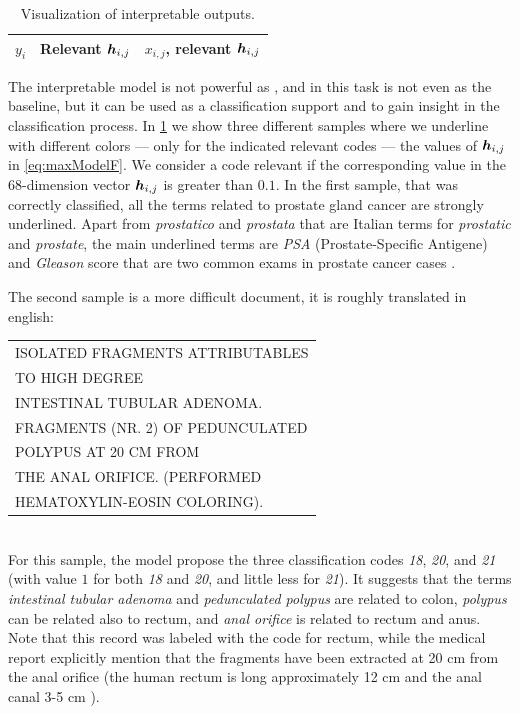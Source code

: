 \begin{table}
  \centering
  \ttfamily
  \scriptsize
  \caption{Visualization of interpretable outputs.}
  \label{tab:multiAttention1}
  \begin{tabular}{|c|c|c|}
    \hline
    $y_i$&\textrm{Relevant} $\bm{h}_{i,j}$&$x_{i,j}$\textrm{, relevant} $\bm{h}_{i,j}$\\
    \hline
    
    \hline
    
    \hline
    
    \hline
  \end{tabular}
\end{table}
The interpretable model is not powerful as \maxp{}, and in this task
is not even as the baseline, but it can be used as a
classification support and to 
gain insight in the classification process. In
\cref{tab:multiAttention1} we show three different samples where we
underline with different colors --- only for the indicated relevant
codes --- the values of $\bm{h}_{i,j}$ in \eqref{eq:maxModelF}. We
consider a code relevant if the corresponding value in the
68-dimension vector $\bm{h}_{i,j}$ is greater than $0.1$. In the
first sample, that was correctly classified, all the terms related to
prostate gland cancer are strongly underlined. Apart from
\emph{prostatico} and \emph{prostata} that are Italian terms for
\emph{prostatic} and \emph{prostate}, the main underlined terms are
\emph{PSA} (Prostate-Specific Antigene) and \emph{Gleason} score that
are two common exams in prostate cancer cases
\cite{brimo2013prostate}.

The second sample is a more difficult
document, it is roughly translated in english:\\
\begin{small}
  \ttfamily
  \begin{tabular}{l}
    ISOLATED FRAGMENTS ATTRIBUTABLES\\
    TO HIGH DEGREE\\
    INTESTINAL TUBULAR ADENOMA.\\
    FRAGMENTS (NR. 2) OF PEDUNCULATED\\
    POLYPUS AT 20 CM FROM\\
    THE ANAL ORIFICE. (PERFORMED\\
    HEMATOXYLIN-EOSIN COLORING).
\end{tabular}
\end{small}\\
For this sample, the model propose the three classification codes \emph{18},
\emph{20}, and \emph{21} (with value $1$ for both \emph{18} and
\emph{20}, and little less for \emph{21}). It suggests that the terms
\emph{intestinal tubular adenoma} and \emph{pedunculated polypus} are
related to colon, \emph{polypus} can be related also to rectum, and
\emph{anal orifice} is related to rectum and anus. Note that this
record was labeled with the code for rectum, while the medical report
explicitly mention that the fragments have been extracted at 20 cm
from the anal orifice (the human rectum is long approximately 12 cm
and the anal canal 3-5 cm \cite{greene2006ajcc}).

